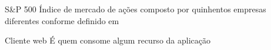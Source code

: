 \begin{siglas}
    \item[S\&P 500] Índice de mercado de ações composto por
                    quinhentos empresas diferentes conforme definido
                    em 

    \item[Cliente web] É quem consome algum recurso da aplicação
\end{siglas}
